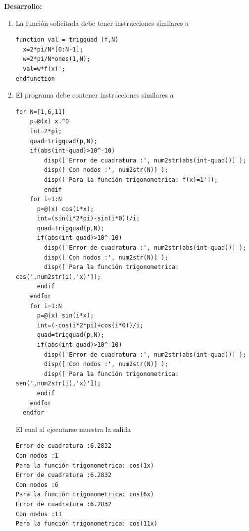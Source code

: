 \documentclass[legalpaper,11pt]{article}
\begin{document}
\begin{enumerate}
\textbf{Desarrollo:}
\begin{enumerate}
\item La funci\'on solicitada debe tener instrucciones similares a
\begin{lstlisting}
function val = trigquad (f,N)
  x=2*pi/N*[0:N-1];
  w=2*pi/N*ones(1,N);
  val=w*f(x)';
endfunction
\end{lstlisting}
\hfill{}

\item El programa debe contener instrucciones similares a
\begin{lstlisting}
for N=[1,6,11]
    p=@(x) x.^0
    int=2*pi;
    quad=trigquad(p,N);
    if(abs(int-quad)>10^-10)
        disp(['Error de cuadratura :', num2str(abs(int-quad))] );
        disp(['Con nodos :', num2str(N)] );
        disp(['Para la función trigonometrica: f(x)=1']);
        endif
    for i=1:N
      p=@(x) cos(i*x);
      int=(sin(i*2*pi)-sin(i*0))/i;
      quad=trigquad(p,N);
      if(abs(int-quad)>10^-10)
        disp(['Error de cuadratura :', num2str(abs(int-quad))] );
        disp(['Con nodos :', num2str(N)] );
        disp(['Para la función trigonometrica: cos(',num2str(i),'x)']);
      endif
    endfor
    for i=1:N
      p=@(x) sin(i*x);
      int=(-cos(i*2*pi)+cos(i*0))/i;
      quad=trigquad(p,N);
      if(abs(int-quad)>10^-10)
        disp(['Error de cuadratura :', num2str(abs(int-quad))] );
        disp(['Con nodos :', num2str(N)] );
        disp(['Para la función trigonometrica: sen(',num2str(i),'x)']);
      endif    
    endfor
  endfor
\end{lstlisting}
\hfill{}

El cual al ejecutarse muestra la salida

\begin{lstlisting}
Error de cuadratura :6.2832
Con nodos :1
Para la función trigonometrica: cos(1x)
Error de cuadratura :6.2832
Con nodos :6
Para la función trigonometrica: cos(6x)
Error de cuadratura :6.2832
Con nodos :11
Para la función trigonometrica: cos(11x)
\end{lstlisting}

\end{enumerate}



\end{enumerate}
\end{document}
